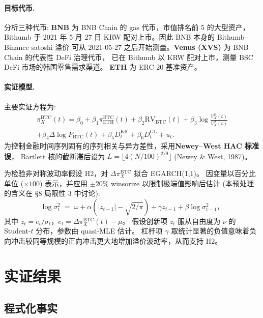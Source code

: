 \documentclass[11pt,a4paper]{article}
\begin{document}
\paragraph{目标代币.}
分析三种代币: \textbf{BNB} 为 BNB Chain 的 gas 代币，市值排名前 5 的大型资产，
Bithumb 于 2021 年 5 月 27 日 KRW 配对上市。因此 BNB 本身的 Bithumb--Binance satoshi 溢价
可从 2021-05-27 之后开始测量。\textbf{Venus (XVS)} 为 BNB Chain 的代表性 DeFi 治理代币，
已在 Bithumb 以 KRW 配对上市，测量 BSC DeFi 市场的韩国零售需求渠道。
\textbf{ETH} 为 ERC-20 基准资产。

\paragraph{实证模型.}
主要实证方程为:
\begin{multline}
\pi^{\text{BTC}}_X(t) = \beta_0 + \beta_1\pi^{\text{BTC}}_{\text{ETH}}(t) + \beta_2\text{RV}_{\text{BTC}}(t)
                       + \beta_3\log\!\tfrac{V_X^B(t)}{V_X^N(t)} \\
                       + \beta_4\Delta\log P_{\text{BTC}}(t)
                       + \beta_5 D^{\text{KR}}_t + \beta_6 D^{\text{GL}}_t + u_t.
\label{eq:reg}
\end{multline}
为控制金融时间序列固有的序列相关与异方差性，采用\textbf{Newey--West HAC 标准误}，
Bartlett 核的截断滞后设为 $L=\lfloor 4(N/100)^{2/9}\rfloor$ (Newey \& West, 1987)。

为检验非对称波动率假设 H2，对 $\Delta\pi^{\text{BTC}}_X$ 拟合 EGARCH(1,1)。
因变量以百分比单位 (\(\times 100\)) 表示，并应用 $\pm 20\%$ winsorize 以限制极端值影响后估计
(本预处理的含义在 \S 8 局限性 3 中讨论):
\begin{equation}
\log\sigma_t^2 \;=\; \omega + \alpha\!\left(|z_{t-1}|-\sqrt{2/\pi}\right) + \gamma z_{t-1} + \beta\log\sigma_{t-1}^2，
\label{eq:egarch}
\end{equation}
其中 $z_t=e_t/\sigma_t$，$e_t=\Delta\pi^{\text{BTC}}_X(t)-\mu$。
假设创新项 $z_t$ 服从自由度为 $\nu$ 的 Student-$t$ 分布，参数由 quasi-MLE 估计。
杠杆项 $\gamma$ 取统计显著的负值意味着负向冲击较同等规模的正向冲击更大地增加溢价波动率，从而支持 H2。

\section{实证结果}

\subsection{程式化事实}
\end{document}
